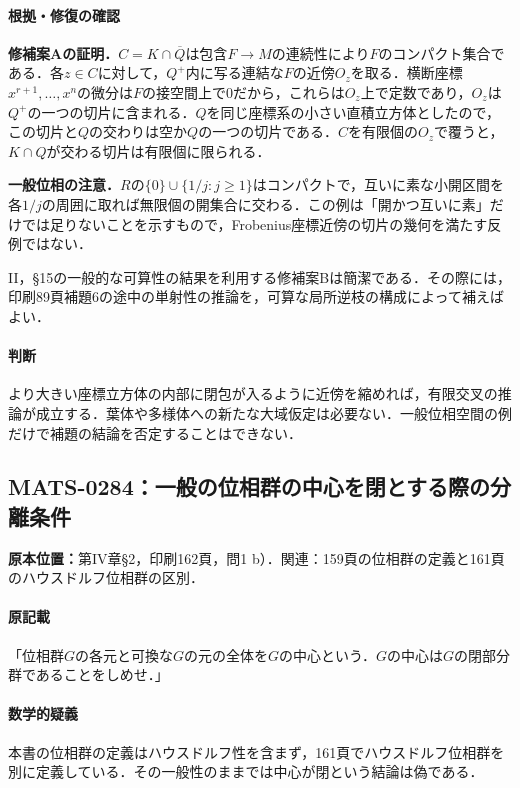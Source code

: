 \documentclass[a4paper,10pt]{ltjsarticle}
\begin{document}
\paragraph{根拠・修復の確認}\textbf{修補案Aの証明．}$C=K\cap\overline Q$は包含$F\to M$の連続性により$F$のコンパクト集合である．各$z\in C$に対して，$Q^+$内に写る連結な$F$の近傍$O_z$を取る．横断座標$x^{r+1},\ldots,x^n$の微分は$F$の接空間上で0だから，これらは$O_z$上で定数であり，$O_z$は$Q^+$の一つの切片に含まれる．$Q$を同じ座標系の小さい直積立方体としたので，この切片と$Q$の交わりは空か$Q$の一つの切片である．$C$を有限個の$O_z$で覆うと，$K\cap Q$が交わる切片は有限個に限られる．\par\textbf{一般位相の注意．}$R$の$\{0\}\cup\{1/j:j\geq1\}$はコンパクトで，互いに素な小開区間を各$1/j$の周囲に取れば無限個の開集合に交わる．この例は「開かつ互いに素」だけでは足りないことを示すもので，Frobenius座標近傍の切片の幾何を満たす反例ではない．\par II，§15の一般的な可算性の結果を利用する修補案Bは簡潔である．その際には，印刷89頁補題6の途中の単射性の推論を，可算な局所逆枝の構成によって補えばよい．

\paragraph{判断}より大きい座標立方体の内部に閉包が入るように近傍を縮めれば，有限交叉の推論が成立する．葉体や多様体への新たな大域仮定は必要ない．一般位相空間の例だけで補題の結論を否定することはできない．


\subsection*{MATS-0284：一般の位相群の中心を閉とする際の分離条件}\label{math:MATS-0284}
\noindent\textbf{原本位置：}第IV章\S2，印刷162頁，問1 b）．関連：159頁の位相群の定義と161頁のハウスドルフ位相群の区別．

\paragraph{原記載}「位相群$G$の各元と可換な$G$の元の全体を$G$の中心という．$G$の中心は$G$の閉部分群であることをしめせ．」

\paragraph{数学的疑義}本書の位相群の定義はハウスドルフ性を含まず，161頁でハウスドルフ位相群を別に定義している．その一般性のままでは中心が閉という結論は偽である．
\end{document}
